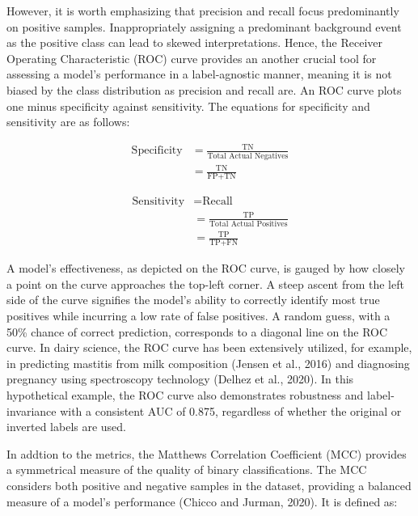 However, it is worth emphasizing that precision and recall focus predominantly on positive samples. Inappropriately assigning a predominant background event as the positive class can lead to skewed interpretations. Hence, the Receiver Operating Characteristic (ROC) curve provides an another crucial tool for assessing a model's performance in a label-agnostic manner, meaning it is not biased by the class distribution as precision and recall are. An ROC curve plots one minus specificity against sensitivity. The equations for specificity and sensitivity are as follows:

\begin{equation} \label{eq_specificity}
    \begin{split}
    \text{Specificity} &= \frac{\text{TN}}{\text{Total Actual Negatives}} \\
                        &=\frac{\text{TN}}{\text{FP} + \text{TN}}
    \end{split}
\end{equation}

\begin{equation} \label{eq_sensitivity}
    \begin{split}
    \text{Sensitivity} &= \text{Recall} \\
                        &= \frac{\text{TP}}{\text{Total Actual Positives}} \\
                        &=\frac{\text{TP}}{\text{TP} + \text{FN}}
    \end{split}
\end{equation}

A model's effectiveness, as depicted on the ROC curve, is gauged by how closely a point on the curve approaches the top-left corner. A steep ascent from the left side of the curve signifies the model's ability to correctly identify most true positives while incurring a low rate of false positives. A random guess, with a 50\% chance of correct prediction, corresponds to a diagonal line on the ROC curve. In dairy science, the ROC curve has been extensively utilized, for example, in predicting mastitis from milk composition (Jensen et al., 2016) and diagnosing pregnancy using spectroscopy technology (Delhez et al., 2020). In this hypothetical example, the ROC curve also demonstrates robustness and label-invariance with a consistent AUC of 0.875, regardless of whether the original or inverted labels are used.

In addtion to the metrics, the Matthews Correlation Coefficient (MCC) provides a symmetrical measure of the quality of binary classifications. The MCC considers both positive and negative samples in the dataset, providing a balanced measure of a model's performance  (Chicco and Jurman, 2020). It is defined as:

